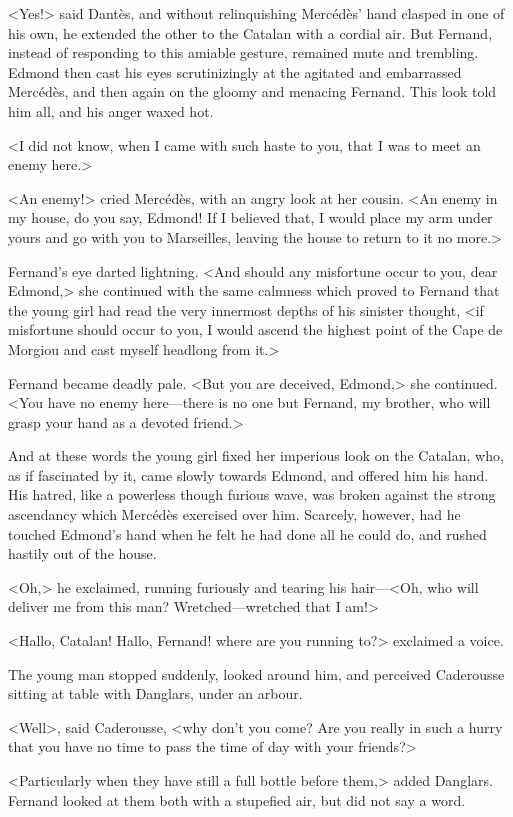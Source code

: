  <Yes!> said Dantès, and without relinquishing Mercédès' hand clasped in one of his own, he extended the other to the Catalan with a cordial air. But Fernand, instead of responding to this amiable gesture, remained mute and trembling. Edmond then cast his eyes scrutinizingly at the agitated and embarrassed Mercédès, and then again on the gloomy and menacing Fernand. This look told him all, and his anger waxed hot. 

 <I did not know, when I came with such haste to you, that I was to meet an enemy here.> 

 <An enemy!> cried Mercédès, with an angry look at her cousin. <An enemy in my house, do you say, Edmond! If I believed that, I would place my arm under yours and go with you to Marseilles, leaving the house to return to it no more.> 

 Fernand's eye darted lightning. <And should any misfortune occur to you, dear Edmond,> she continued with the same calmness which proved to Fernand that the young girl had read the very innermost depths of his sinister thought, <if misfortune should occur to you, I would ascend the highest point of the Cape de Morgiou and cast myself headlong from it.> 

 Fernand became deadly pale. <But you are deceived, Edmond,> she continued. <You have no enemy here—there is no one but Fernand, my brother, who will grasp your hand as a devoted friend.> 

 And at these words the young girl fixed her imperious look on the Catalan, who, as if fascinated by it, came slowly towards Edmond, and offered him his hand. His hatred, like a powerless though furious wave, was broken against the strong ascendancy which Mercédès exercised over him. Scarcely, however, had he touched Edmond's hand when he felt he had done all he could do, and rushed hastily out of the house. 

 <Oh,> he exclaimed, running furiously and tearing his hair—<Oh, who will deliver me from this man? Wretched—wretched that I am!> 

 <Hallo, Catalan! Hallo, Fernand! where are you running to?> exclaimed a voice. 

 The young man stopped suddenly, looked around him, and perceived Caderousse sitting at table with Danglars, under an arbour. 

 <Well>, said Caderousse, <why don't you come? Are you really in such a hurry that you have no time to pass the time of day with your friends?> 

 <Particularly when they have still a full bottle before them,> added Danglars. Fernand looked at them both with a stupefied air, but did not say a word. 

